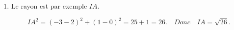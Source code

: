 \begin{enumerate}
		\[
		\begin{cases}
			3x + 2y - 6 = 0 \\
			x - y - 2 = 0
		\end{cases}
		\iff
		\begin{cases}
			3x + 2y - 6 = 0 \\
			x - 2 = y
		\end{cases}
		\iff
		\begin{cases}
			3x + 2(x - 2) - 6 = 0 \\
			x - 2 = y
		\end{cases}
		\iff
		\begin{cases}
			3x + 2x - 4 - 6 = 0 \\
			x - 2 = y
		\end{cases}
		\iff
		\begin{cases}
			5x = 10 \\
			x - 2 = y
		\end{cases}
		\iff
		\begin{cases}
			x = 2 \\
			y = 0
		\end{cases}.
		\]
		
		Les coordonnées de \(I\) sont \((2 ; 0)\).
		
		\item Le rayon est par exemple \(IA\).
		
		\[
		IA^2 = (-3 - 2)^2 + (1 - 0)^2 = 25 + 1 = 26. \quad Donc \quad IA = \sqrt{26}.
		\]
	\end{enumerate}
